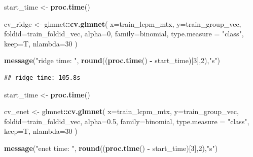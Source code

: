\documentclass[
]{book}
\newenvironment{Shaded}{\begin{snugshade}}{\end{snugshade}}
\newcommand{\DataTypeTok}[1]{\textcolor[rgb]{0.13,0.29,0.53}{#1}}
\newcommand{\DecValTok}[1]{\textcolor[rgb]{0.00,0.00,0.81}{#1}}
\newcommand{\FloatTok}[1]{\textcolor[rgb]{0.00,0.00,0.81}{#1}}
\newcommand{\KeywordTok}[1]{\textcolor[rgb]{0.13,0.29,0.53}{\textbf{#1}}}
\newcommand{\NormalTok}[1]{#1}
\newcommand{\OperatorTok}[1]{\textcolor[rgb]{0.81,0.36,0.00}{\textbf{#1}}}
\newcommand{\StringTok}[1]{\textcolor[rgb]{0.31,0.60,0.02}{#1}}
\begin{document}
\begin{Shaded}
\begin{Highlighting}[]
\NormalTok{start\_time <{-}}\StringTok{  }\KeywordTok{proc.time}\NormalTok{()}

\NormalTok{cv\_ridge <{-}}\StringTok{ }\NormalTok{glmnet}\OperatorTok{::}\KeywordTok{cv.glmnet}\NormalTok{(}
 \DataTypeTok{x=}\NormalTok{train\_lcpm\_mtx,}
 \DataTypeTok{y=}\NormalTok{train\_group\_vec,}
 \DataTypeTok{foldid=}\NormalTok{train\_foldid\_vec,}
 \DataTypeTok{alpha=}\DecValTok{0}\NormalTok{,}
 \DataTypeTok{family=}\StringTok{\textquotesingle{}binomial\textquotesingle{}}\NormalTok{, }
 \DataTypeTok{type.measure =} \StringTok{"class"}\NormalTok{,}
 \DataTypeTok{keep=}\NormalTok{T,}
 \DataTypeTok{nlambda=}\DecValTok{30}
\NormalTok{)}

\KeywordTok{message}\NormalTok{(}\StringTok{"ridge time: "}\NormalTok{, }\KeywordTok{round}\NormalTok{((}\KeywordTok{proc.time}\NormalTok{() }\OperatorTok{{-}}\StringTok{ }\NormalTok{start\_time)[}\DecValTok{3}\NormalTok{],}\DecValTok{2}\NormalTok{),}\StringTok{"s"}\NormalTok{)}
\end{Highlighting}
\end{Shaded}

\begin{verbatim}
## ridge time: 105.8s
\end{verbatim}

\begin{Shaded}
\begin{Highlighting}[]
\NormalTok{start\_time <{-}}\StringTok{  }\KeywordTok{proc.time}\NormalTok{()}

\NormalTok{cv\_enet <{-}}\StringTok{ }\NormalTok{glmnet}\OperatorTok{::}\KeywordTok{cv.glmnet}\NormalTok{(}
 \DataTypeTok{x=}\NormalTok{train\_lcpm\_mtx,}
 \DataTypeTok{y=}\NormalTok{train\_group\_vec,}
 \DataTypeTok{foldid=}\NormalTok{train\_foldid\_vec,}
 \DataTypeTok{alpha=}\FloatTok{0.5}\NormalTok{,}
 \DataTypeTok{family=}\StringTok{\textquotesingle{}binomial\textquotesingle{}}\NormalTok{,}
 \DataTypeTok{type.measure =} \StringTok{"class"}\NormalTok{,}
 \DataTypeTok{keep=}\NormalTok{T,}
 \DataTypeTok{nlambda=}\DecValTok{30}
\NormalTok{)}

\KeywordTok{message}\NormalTok{(}\StringTok{"enet time: "}\NormalTok{, }\KeywordTok{round}\NormalTok{((}\KeywordTok{proc.time}\NormalTok{() }\OperatorTok{{-}}\StringTok{ }\NormalTok{start\_time)[}\DecValTok{3}\NormalTok{],}\DecValTok{2}\NormalTok{),}\StringTok{"s"}\NormalTok{)}
\end{Highlighting}
\end{Shaded}
\end{document}
